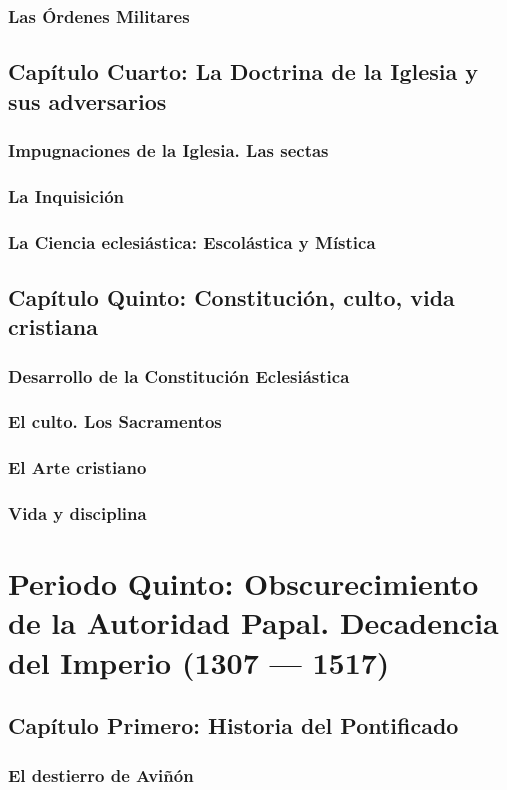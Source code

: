 \raggedbottom{} \documentclass[12pt, a4paper]{book}
\begin{document}
\section{Las Órdenes Militares}
\chapter{Capítulo Cuarto: La Doctrina de la Iglesia y sus adversarios}
\section{Impugnaciones de la Iglesia. Las sectas}
\section{La Inquisición}
\section{La Ciencia eclesiástica: Escolástica y Mística}
\chapter{Capítulo Quinto: Constitución, culto, vida cristiana}
\section{Desarrollo de la Constitución Eclesiástica}
\section{El culto. Los Sacramentos}
\section{El Arte cristiano}
\section{Vida y disciplina}
\part{Periodo Quinto: Obscurecimiento de la Autoridad Papal. Decadencia del Imperio (1307 --- 1517)}
\chapter{Capítulo Primero: Historia del Pontificado}
\section{El destierro de Aviñón}
\end{document}
